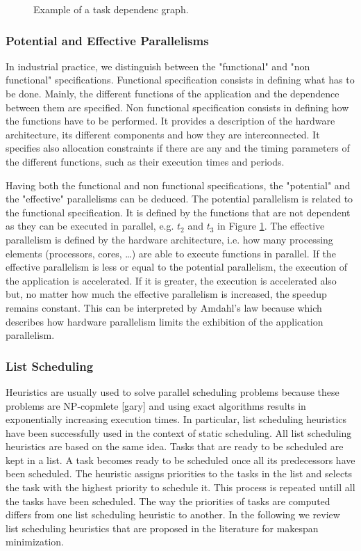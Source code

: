 \begin{figure}[phbt]
\centering

\caption{Example of a task dependenc graph.}
\label{fig:dagex}
\end{figure} 

\subsubsection{Potential and Effective Parallelisms}

In industrial practice, we distinguish between the "functional" and "non functional" specifications. Functional specification consists in defining what has to be done. Mainly, the different functions of the application and the dependence between them are specified. Non functional specification consists in defining how the functions have to be performed. It provides a description of the hardware architecture, its different components and how they are interconnected. It specifies also allocation constraints if there are any and the timing parameters of the different functions, such as their execution times and periods.

Having both the functional and non functional specifications, the "potential" and the "effective" parallelisms can be deduced. The potential parallelism is related to the functional specification. It is defined by the functions that are not dependent as they can be executed in parallel, e.g. $t_2$ and $t_3$ in Figure \ref{fig:dagex}. The effective parallelism is defined by the hardware architecture, i.e. how many processing elements (processors, cores, \ldots) are able to execute functions in parallel. If the effective parallelism is less or equal to the potential parallelism, the execution of the application is accelerated. If it is greater, the execution is accelerated also but, no matter how much the effective parallelism is increased, the speedup remains constant. This can be interpreted by Amdahl's law because which describes how hardware parallelism limits the exhibition of the application parallelism.


\subsubsection{List Scheduling}

Heuristics are usually used to solve parallel scheduling problems because these problems are NP-copmlete [gary] and using exact algorithms results in exponentially increasing execution times. In particular, list scheduling heuristics have been successfully used in the context of static scheduling. All list scheduling heuristics are based on the same idea. Tasks that are ready to be scheduled are kept in a list. A task becomes ready to be scheduled once all its predecessors have been scheduled. The heuristic assigns priorities to the tasks in the list and selects the task with the highest priority to schedule it. This process is repeated untill all the tasks have been scheduled. The way the priorities of tasks are computed differs from one list scheduling heuristic to another. In the following we review list scheduling heuristics that are proposed in the literature for makespan minimization.

